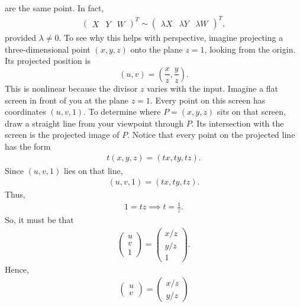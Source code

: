 \documentclass{report}
\begin{document}
\begin{itemize}
            are the same point. In fact,
            \begin{align*}
                \begin{pmatrix} X & Y & W \end{pmatrix}^{T} \sim \begin{pmatrix} \lambda X & \lambda Y & \lambda W \end{pmatrix}^{T}
            ,\end{align*}
            provided $\lambda \ne 0$.
            \bigbreak \noindent 
            To see why this helps with perspective, imagine projecting a three-dimensional point \((x,y,z)\) onto the plane \(z=1\), looking from the origin. Its projected position is
            \[
                (u,v)=\left(\frac{x}{z},\frac{y}{z}\right).
            \]
            This is nonlinear because the divisor \(z\) varies with the input.
            \bigbreak \noindent 
            Imagine a flat screen in front of you at the plane \(z=1\). Every point on this screen has coordinates \((u,v,1)\). To determine where $P = (x,y,z)$ sits on that screen, draw a straight line from your viewpoint through $P$. Its intersection with the screen is the projected image of $P$.
            \bigbreak \noindent 
            Notice that every point on the projected line has the form
            \begin{align*}
                t(x,y,z) = (tx,ty,tz)
            .\end{align*}
            Since $(u,v,1)$ lies on that line,
            \begin{align*}
                (u,v,1) = (tx,ty,tz)
            .\end{align*}
            Thus, 
            \begin{align*}
                1 = tz \implies t = \frac{1}{z}
            .\end{align*}
            So, it must be that
            \begin{align*}
                \begin{pmatrix} u \\ v \\ 1 \end{pmatrix} = \begin{pmatrix} x/z \\ y/z \\ 1 \end{pmatrix}
            .\end{align*}
            Hence,
            \begin{align*}
                \begin{pmatrix} u \\ v \end{pmatrix} = \begin{pmatrix} x/z \\ y/z \end{pmatrix}

\end{align*}
\end{itemize}
\end{document}
